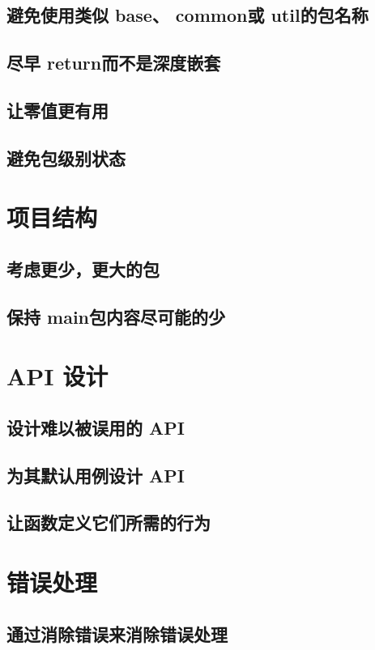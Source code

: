 \documentclass{paper}
\begin{document}
\subsection{避免使用类似 base、 common或 util的包名称}
\subsection{尽早 return而不是深度嵌套}
\subsection{让零值更有用}
\subsection{避免包级别状态}

\section{项目结构}

\subsection{考虑更少，更大的包}
\subsection{保持 main包内容尽可能的少}

\newpage

\section{API 设计}

\subsection{设计难以被误用的 API}
\subsection{为其默认用例设计 API}
\subsection{让函数定义它们所需的行为}

\section{错误处理}

\subsection{通过消除错误来消除错误处理}
\end{document}
